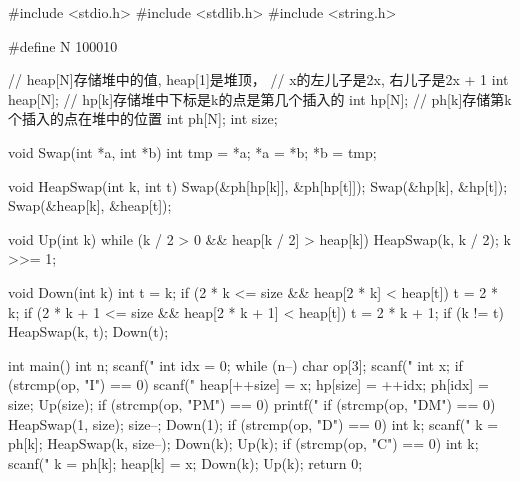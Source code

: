 \begin{mycpptwocol}[可修改任意元素的堆]
    #include <stdio.h>
    #include <stdlib.h>
    #include <string.h>

    #define N 100010

    // heap[N]存储堆中的值, heap[1]是堆顶，
    // x的左儿子是2x, 右儿子是2x + 1
    int heap[N];
    // hp[k]存储堆中下标是k的点是第几个插入的
    int hp[N];
    // ph[k]存储第k个插入的点在堆中的位置
    int ph[N];
    int size;

    void Swap(int *a, int *b)
        {
        int tmp = *a;
        *a = *b;
        *b = tmp;
    }

    void HeapSwap(int k, int t)
        {
        Swap(&ph[hp[k]], &ph[hp[t]]);
        Swap(&hp[k], &hp[t]);
        Swap(&heap[k], &heap[t]);
    }

    void Up(int k)
        {
        while (k / 2 > 0 &&
        heap[k / 2] > heap[k]) {
            HeapSwap(k, k / 2);
            k >>= 1;
        }
    }

    void Down(int k)
        {
        int t = k;
        if (2 * k <= size &&
        heap[2 * k] < heap[t]) {
            t = 2 * k;
        }
        if (2 * k + 1 <= size &&
        heap[2 * k + 1] < heap[t]) {
            t = 2 * k + 1;
        }
        if (k != t) {
            HeapSwap(k, t);
            Down(t);
        }
    }

    int main()
        {
        int n;
        scanf("%
        int idx = 0;
        while (n--) {
            char op[3];
            scanf("%
            int x;
            if (strcmp(op, "I") == 0) {
                scanf("%
                heap[++size] = x;
                hp[size] = ++idx;
                ph[idx] = size;
                Up(size);
            }
            if (strcmp(op, "PM") == 0) {
                printf("%
            }
            if (strcmp(op, "DM") == 0) {
                HeapSwap(1, size);
                size--;
                Down(1);
            }
            if (strcmp(op, "D") == 0) {
                int k;
                scanf("%
                k = ph[k];
                HeapSwap(k, size--);
                Down(k);
                Up(k);
            }
            if (strcmp(op, "C") == 0) {
                int k;
                scanf("%
                k = ph[k];
                heap[k] = x;
                Down(k);
                Up(k);
            }
        }
        return 0;
    }
\end{mycpptwocol}


